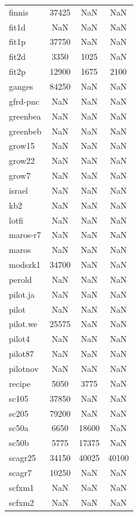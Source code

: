 \begin{longtable}{lccc}
finnis   & 37425 &   NaN &    NaN \\
fit1d    &   NaN &   NaN &    NaN \\
fit1p    & 37750 &   NaN &    NaN \\
fit2d    &  3350 &  1025 &    NaN \\
fit2p    & 12900 &  1675 &   2100 \\
ganges   & 84250 &   NaN &    NaN \\
gfrd-pnc &   NaN &   NaN &    NaN \\
greenbea &   NaN &   NaN &    NaN \\
greenbeb &   NaN &   NaN &    NaN \\
grow15   &   NaN &   NaN &    NaN \\
grow22   &   NaN &   NaN &    NaN \\
grow7    &   NaN &   NaN &    NaN \\
israel   &   NaN &   NaN &    NaN \\
kb2      &   NaN &   NaN &    NaN \\
lotfi    &   NaN &   NaN &    NaN \\
maros-r7 &   NaN &   NaN &    NaN \\
maros    &   NaN &   NaN &    NaN \\
modszk1  & 34700 &   NaN &    NaN \\
perold   &   NaN &   NaN &    NaN \\
pilot.ja &   NaN &   NaN &    NaN \\
pilot    &   NaN &   NaN &    NaN \\
pilot.we & 25575 &   NaN &    NaN \\
pilot4   &   NaN &   NaN &    NaN \\
pilot87  &   NaN &   NaN &    NaN \\
pilotnov &   NaN &   NaN &    NaN \\
recipe   &  5050 &  3775 &    NaN \\
sc105    & 37850 &   NaN &    NaN \\
sc205    & 79200 &   NaN &    NaN \\
sc50a    &  6650 & 18600 &    NaN \\
sc50b    &  5775 & 17375 &    NaN \\
scagr25  & 34150 & 40025 &  40100 \\
scagr7   & 10250 &   NaN &    NaN \\
scfxm1   &   NaN &   NaN &    NaN \\
scfxm2   &   NaN &   NaN &    NaN \\

\end{longtable}
